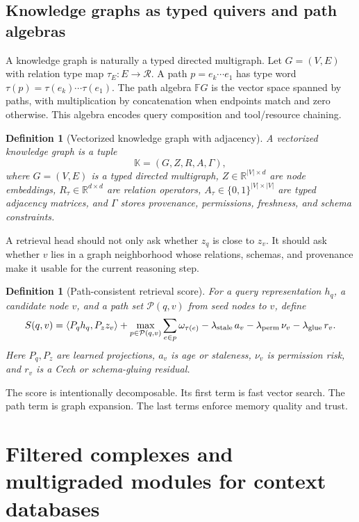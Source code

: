 \documentclass[11pt]{article}
\newtheorem{definition}[theorem]{Definition}
\newcommand{\RR}{\mathbb{R}}
\newcommand{\FF}{\mathbb{F}}
\numberwithin{equation}{section}
\begin{document}
\subsection{Knowledge graphs as typed quivers and path algebras}
A knowledge graph is naturally a typed directed multigraph. Let $G=(V,E)$ with relation type map $\tau_E:E\to\mathcal{R}$. A path $p=e_k\cdots e_1$ has type word $\tau(p)=\tau(e_k)\cdots\tau(e_1)$. The path algebra $\FF G$ is the vector space spanned by paths, with multiplication by concatenation when endpoints match and zero otherwise. This algebra encodes query composition and tool/resource chaining.

\begin{definition}[Vectorized knowledge graph with adjacency]
A vectorized knowledge graph is a tuple
\begin{equation}
\mathbb{K}=(G,Z,R,A,\Gamma),
\end{equation}
where $G=(V,E)$ is a typed directed multigraph, $Z\in\RR^{|V|\times d}$ are node embeddings, $R_{\tau}\in\RR^{d\times d}$ are relation operators, $A_\tau\in\{0,1\}^{|V|\times |V|}$ are typed adjacency matrices, and $\Gamma$ stores provenance, permissions, freshness, and schema constraints.
\end{definition}

A retrieval head should not only ask whether $z_q$ is close to $z_v$. It should ask whether $v$ lies in a graph neighborhood whose relations, schemas, and provenance make it usable for the current reasoning step.

\begin{definition}[Path-consistent retrieval score]
For a query representation $h_q$, a candidate node $v$, and a path set $\mathcal{P}(q,v)$ from seed nodes to $v$, define
\begin{equation}
S(q,v)=\langle P_q h_q,P_z z_v\rangle+\max_{p\in\mathcal{P}(q,v)}\sum_{e\in p}\omega_{\tau(e)}-\lambda_{\rm stale}\,a_v-\lambda_{\rm perm}\,\nu_v-\lambda_{\rm glue}\,r_v.
\end{equation}
Here $P_q,P_z$ are learned projections, $a_v$ is age or staleness, $\nu_v$ is permission risk, and $r_v$ is a Cech or schema-gluing residual.
\end{definition}

The score is intentionally decomposable. Its first term is fast vector search. The path term is graph expansion. The last terms enforce memory quality and trust.

\section{Filtered complexes and multigraded modules for context databases}
\end{document}
